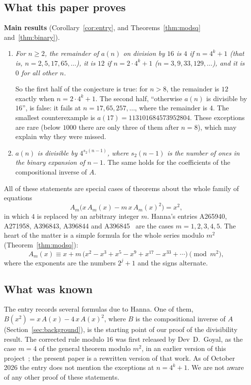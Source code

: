 \documentclass[11pt,a4paper]{article}
\theoremstyle{definition}
\theoremstyle{remark}
\begin{document}
\subsection{What this paper proves}
\textbf{Main results} (Corollary~\ref{cor:entry}, and Theorems~\ref{thm:modsq} and~\ref{thm:binary}).
\begin{enumerate}
\item \emph{For $n\ge2$, the remainder of $a(n)$ on division by $16$ is $4$ if $n=4^k+1$ (that is, $n=2,5,17,65,\dots$), it
is $12$ if $n=2\cdot4^k+1$ ($n=3,9,33,129,\dots$), and it is $0$ for all other $n$.}

So the first half of the conjecture is true: for $n>8$, the remainder is $12$ exactly when $n=2\cdot4^k+1$. The second
half, ``otherwise $a(n)$ is divisible by $16$'', is false: it fails at $n=17,65,257,\dots$, where the remainder is $4$.
The smallest counterexample is $a(17)=113101684573952804$. These exceptions are rare (below $1000$ there are only three
of them after $n=8$), which may explain why they were missed.
\item \emph{$a(n)$ is divisible by $4^{s_2(n-1)}$, where $s_2(n-1)$ is the number of ones in the binary expansion of
$n-1$.} The same holds for the coefficients of the compositional inverse of $A$.
\end{enumerate}

All of these statements are special cases of theorems about the whole family of equations
\[
A_m\bigl(x\,A_m(x)-m\,x\,A_m(x)^2\bigr)=x^2,
\]
in which $4$ is replaced by an arbitrary integer $m$. Hanna's entries A265940, A271958, A396843,
A396844 and A396845~\cite{oeis1,oeis2,oeis3,oeis4,oeis5} are the cases $m=1,2,3,4,5$. The heart of the matter is a
simple formula for the whole series modulo $m^2$ (Theorem~\ref{thm:modsq}):
\[
A_m(x)\equiv x+m\,\bigl(x^2-x^3+x^5-x^9+x^{17}-x^{33}+\cdots\bigr)\pmod{m^2},
\]
where the exponents are the numbers $2^j+1$ and the signs alternate.

\subsection{What was known}
The entry records several formulas due to Hanna. One of them, $B(x^2)=x\,A(x)-4\,x\,A(x)^2$, where $B$ is
the compositional inverse of $A$ (Section~\ref{sec:background}), is the starting point of our proof of the divisibility
result. The corrected rule modulo $16$ was first released by Dev~D.~Goyal, as the case $m=4$ of the general
theorem modulo $m^2$, in an earlier version of this project~\cite{zenodo}; the present paper is a rewritten version of
that work. As of October 2026 the entry does not mention the exceptions at $n=4^k+1$.
We are not aware of any other proof of these statements.
\end{document}
